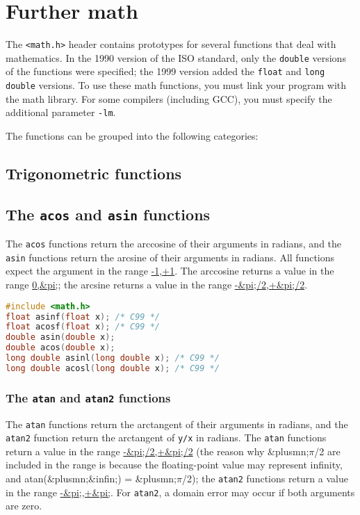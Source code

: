 \section{Further math}
The \texttt{\textless{}math.h\textgreater{}} header contains prototypes for
several functions that deal with mathematics. In the 1990 version of the ISO
standard, only the \texttt{double} versions of the functions were specified;
the 1999 version added the \texttt{float} and \texttt{long double} versions. To
use these math functions, you must link your program with the math library. For
some compilers (including GCC), you must specify the additional parameter
\texttt{-lm}.

The functions can be grouped into the following categories:
\subsection{Trigonometric functions}
\subsection{The \texttt{acos} and \texttt{asin} functions}
The \texttt{acos} functions return the arccosine of their arguments in radians,
and the \texttt{asin} functions return the arcsine of their arguments in
radians. All functions expect the argument in the range \url{-1,+1}. The
arccosine returns a value in the range \url{0,&pi;}; the arcsine returns a
value in the range \url{-&pi;/2,+&pi;/2}.

\lstset{basicstyle=\scriptsize, numbers=left, captionpos=b, tabsize=4}
\begin{lstlisting}[caption=Section \thesection listing \arabic{furthermathcnt},language={C},
breaklines=true,xleftmargin=15pt,label=lst:section\thesection listing\arabic{furthermathcnt}]
#include <math.h>
float asinf(float x); /* C99 */
float acosf(float x); /* C99 */
double asin(double x);
double acos(double x);
long double asinl(long double x); /* C99 */
long double acosl(long double x); /* C99 */
\end{lstlisting}

\subsubsection{The \texttt{atan} and \texttt{atan2} functions}
The \texttt{atan} functions return the arctangent of their arguments in
radians, and the \texttt{atan2} function return the arctangent of \texttt{y/x}
in radians. The \texttt{atan} functions return a value in the range
\url{-&pi;/2,+&pi;/2} (the reason why \&plusmn;\ensuremath{\pi}/2 are included
in the range is because the floating-point value may represent infinity, and
atan(\&plusmn;\&infin;) = \&plusmn;\ensuremath{\pi}/2); the \texttt{atan2}
functions return a value in the range \url{-&pi;,+&pi;}. For \texttt{atan2}, a
domain error may occur if both arguments are zero.


